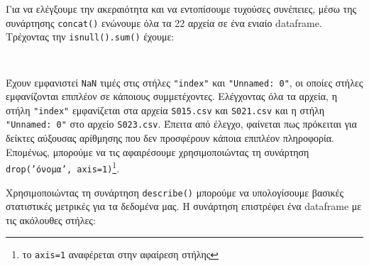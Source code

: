         Για να ελέγξουμε την ακεραιότητα και να εντοπίσουμε τυχούσες συνέπειες, μέσω της συνάρτησης \texttt{concat()} ενώνουμε όλα τα 22 αρχεία σε ένα ενιαίο dataframe.
        Τρέχοντας την \texttt{isnull().sum()} έχουμε:

        \begin{table}[ht] \noindent\centering\tt
        \end{table}

        Έχουν εμφανιστεί \texttt{NaN} τιμές στις στήλες \texttt{"index"} και \texttt{"Unnamed: 0"}, οι οποίες στήλες εμφανίζονται επιπλέον σε κάποιους συμμετέχοντες.
        Ελέγχοντας όλα τα αρχεία, η στήλη \texttt{"index"} εμφανίζεται στα αρχεία \texttt{S015.csv} και \texttt{S021.csv} και η στήλη \texttt{"Unnamed: 0"} στο αρχείο \texttt{S023.csv}.
        Έπειτα από έλεγχο, φαίνεται πως πρόκειται για δείκτες αύξουσας αρίθμησης που δεν προσφέρουν κάποια επιπλέον πληροφορία.
        Επομένως, μπορούμε να τις αφαιρέσουμε χρησιμοποιώντας τη συνάρτηση \texttt{drop('όνομα', axis=1)}\footnote{το \texttt{axis=1} αναφέρεται στην αφαίρεση στήλης}.

        Χρησιμοποιώντας τη συνάρτηση \texttt{describe()} μπορούμε να υπολογίσουμε βασικές στατιστικές μετρικές για τα δεδομένα μας.
        Η συνάρτηση επιστρέφει ένα dataframe με τις ακόλουθες στήλες:

